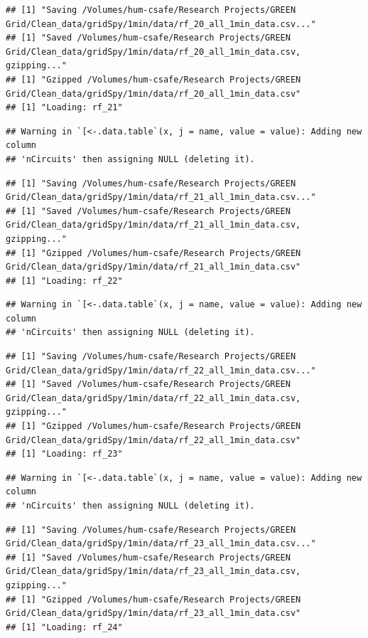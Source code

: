 \documentclass[]{article}
\begin{document}
\begin{verbatim}
## [1] "Saving /Volumes/hum-csafe/Research Projects/GREEN Grid/Clean_data/gridSpy/1min/data/rf_20_all_1min_data.csv..."
## [1] "Saved /Volumes/hum-csafe/Research Projects/GREEN Grid/Clean_data/gridSpy/1min/data/rf_20_all_1min_data.csv, gzipping..."
## [1] "Gzipped /Volumes/hum-csafe/Research Projects/GREEN Grid/Clean_data/gridSpy/1min/data/rf_20_all_1min_data.csv"
## [1] "Loading: rf_21"
\end{verbatim}

\begin{verbatim}
## Warning in `[<-.data.table`(x, j = name, value = value): Adding new column
## 'nCircuits' then assigning NULL (deleting it).
\end{verbatim}

\begin{verbatim}
## [1] "Saving /Volumes/hum-csafe/Research Projects/GREEN Grid/Clean_data/gridSpy/1min/data/rf_21_all_1min_data.csv..."
## [1] "Saved /Volumes/hum-csafe/Research Projects/GREEN Grid/Clean_data/gridSpy/1min/data/rf_21_all_1min_data.csv, gzipping..."
## [1] "Gzipped /Volumes/hum-csafe/Research Projects/GREEN Grid/Clean_data/gridSpy/1min/data/rf_21_all_1min_data.csv"
## [1] "Loading: rf_22"
\end{verbatim}

\begin{verbatim}
## Warning in `[<-.data.table`(x, j = name, value = value): Adding new column
## 'nCircuits' then assigning NULL (deleting it).
\end{verbatim}

\begin{verbatim}
## [1] "Saving /Volumes/hum-csafe/Research Projects/GREEN Grid/Clean_data/gridSpy/1min/data/rf_22_all_1min_data.csv..."
## [1] "Saved /Volumes/hum-csafe/Research Projects/GREEN Grid/Clean_data/gridSpy/1min/data/rf_22_all_1min_data.csv, gzipping..."
## [1] "Gzipped /Volumes/hum-csafe/Research Projects/GREEN Grid/Clean_data/gridSpy/1min/data/rf_22_all_1min_data.csv"
## [1] "Loading: rf_23"
\end{verbatim}

\begin{verbatim}
## Warning in `[<-.data.table`(x, j = name, value = value): Adding new column
## 'nCircuits' then assigning NULL (deleting it).
\end{verbatim}

\begin{verbatim}
## [1] "Saving /Volumes/hum-csafe/Research Projects/GREEN Grid/Clean_data/gridSpy/1min/data/rf_23_all_1min_data.csv..."
## [1] "Saved /Volumes/hum-csafe/Research Projects/GREEN Grid/Clean_data/gridSpy/1min/data/rf_23_all_1min_data.csv, gzipping..."
## [1] "Gzipped /Volumes/hum-csafe/Research Projects/GREEN Grid/Clean_data/gridSpy/1min/data/rf_23_all_1min_data.csv"
## [1] "Loading: rf_24"
\end{verbatim}
\end{document}
